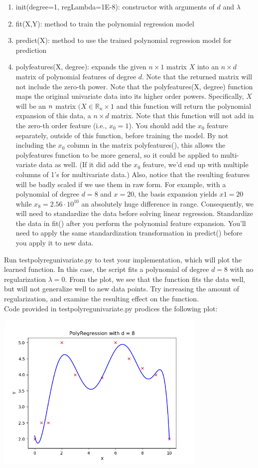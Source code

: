 \documentclass{article}
\newcommand{\field}[1]{\mathbb{#1}}
\newcommand{\1}{\mathbf{1}}
\newcommand{\R}{\field{R}} %
\begin{document}
\begin{enumerate}
    \item init(degree=1, regLambda=1E-8):  constructor with arguments of $d$ and $\lambda$
    \item fit(X,Y): method to train the polynomial regression model
    \item predict(X): method to use the trained polynomial regression model for prediction
    \item polyfeatures(X, degree): expands the given $n\times1$ matrix $X$ into an $n\times d$ matrix of polynomial features of degree $d$. Note that the returned matrix will not include the zero-th power. Note that the polyfeatures(X, degree) function maps the original univariate data into its higher order powers. Specifically, $X$ will be an $n\time1$ matrix $(X\in\R_n\times1$ and this function will return the polynomial expansion of this data,  a $n\times d$ matrix. Note that this function will not add in the zero-th order feature (i.e., $x_0= 1$). You should add the $x_0$ feature separately, outside of this function, before training the model. By not including the $x_0$ column in the matrix polyfeatures(), this allows the polyfeatures function to be more general, so it could be applied to multi-variate data as well. (If it did add the $x_0$ feature, we’d end up with multiple columns of 1’s for multivariate data.) Also, notice that the resulting features will be badly scaled if we use them in raw form. For example, with a polynomial of degree $d=8$ and $x=20$, the basis expansion yields $x1=20$ while $x_8=2.56\cdot10^{10}$ an absolutely huge difference in range. Consequently, we will need to standardize the data before solving linear regression. Standardize the data in fit() after you perform the polynomial feature expansion. You’ll need to apply the same standardization transformation in predict() before you apply it to new data.
\end{enumerate}
Run testpolyregunivariate.py to test your implementation, which will plot the learned function. In this case, the script fits a polynomial of degree $d=8$ with no regularization $\lambda=0$. From the plot, we see that the function fits the data well, but will not generalize well to new data points. Try increasing the amount of regularization, and examine the resulting effect on the function. \\
Code provided in testpolyregunivariate.py prodices the following plot:
\begin{center}
    \includegraphics[width=4in]{HW1/HW1_plots/PolyFit.png}
\end{center} 
\end{document}
